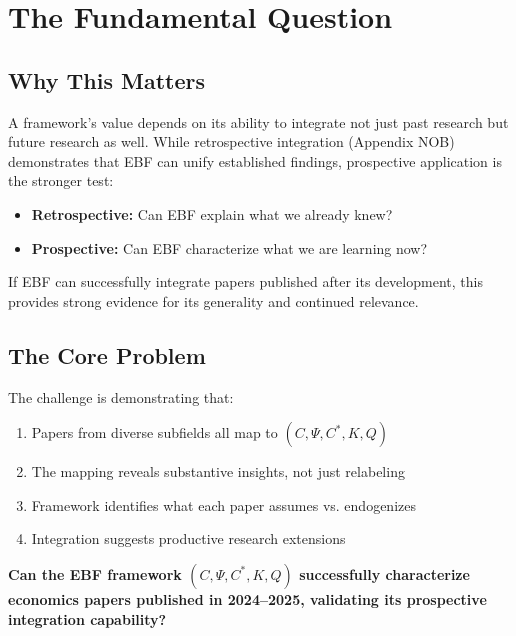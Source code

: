 \section{The Fundamental Question}
\label{sec:J-fundamental}

\subsection{Why This Matters}

A framework's value depends on its ability to integrate not just past research
but future research as well. While retrospective integration (Appendix NOB)
demonstrates that EBF can unify established findings, prospective application
is the stronger test:

\begin{itemize}
    \item \textbf{Retrospective:} Can EBF explain what we already knew?
    \item \textbf{Prospective:} Can EBF characterize what we are learning now?
\end{itemize}

If EBF can successfully integrate papers published after its development,
this provides strong evidence for its generality and continued relevance.

\subsection{The Core Problem}

The challenge is demonstrating that:
\begin{enumerate}
    \item Papers from diverse subfields all map to $(C, \Psi, C^*, K, Q)$
    \item The mapping reveals substantive insights, not just relabeling
    \item Framework identifies what each paper assumes vs. endogenizes
    \item Integration suggests productive research extensions
\end{enumerate}

\begin{tcolorbox}[colback=red!5!white, colframe=red!75!black,
    title=The Fundamental Question]
\textbf{Can the EBF framework $(C, \Psi, C^*, K, Q)$ successfully characterize
economics papers published in 2024--2025, validating its prospective
integration capability?}
\end{tcolorbox}


